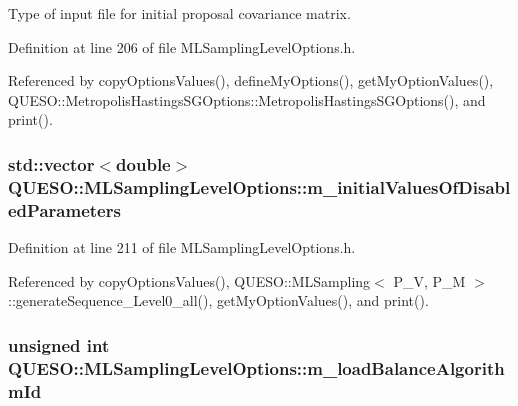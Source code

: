 Type of input file for initial proposal covariance matrix. 



Definition at line 206 of file M\-L\-Sampling\-Level\-Options.\-h.



Referenced by copy\-Options\-Values(), define\-My\-Options(), get\-My\-Option\-Values(), Q\-U\-E\-S\-O\-::\-Metropolis\-Hastings\-S\-G\-Options\-::\-Metropolis\-Hastings\-S\-G\-Options(), and print().

\hypertarget{class_q_u_e_s_o_1_1_m_l_sampling_level_options_a50cbdab5fe9fbda97aca16d206888a18}{
\subsubsection[{m\-\_\-initial\-Values\-Of\-Disabled\-Parameters}]{\setlength{\rightskip}{0pt plus 5cm}std\-::vector$<$double$>$ Q\-U\-E\-S\-O\-::\-M\-L\-Sampling\-Level\-Options\-::m\-\_\-initial\-Values\-Of\-Disabled\-Parameters}}\label{class_q_u_e_s_o_1_1_m_l_sampling_level_options_a50cbdab5fe9fbda97aca16d206888a18}


Definition at line 211 of file M\-L\-Sampling\-Level\-Options.\-h.



Referenced by copy\-Options\-Values(), Q\-U\-E\-S\-O\-::\-M\-L\-Sampling$<$ P\-\_\-\-V, P\-\_\-\-M $>$\-::generate\-Sequence\-\_\-\-Level0\-\_\-all(), get\-My\-Option\-Values(), and print().

\hypertarget{class_q_u_e_s_o_1_1_m_l_sampling_level_options_af8f5d4ef3048da3e201e43ecc0a399fb}{
\subsubsection[{m\-\_\-load\-Balance\-Algorithm\-Id}]{\setlength{\rightskip}{0pt plus 5cm}unsigned int Q\-U\-E\-S\-O\-::\-M\-L\-Sampling\-Level\-Options\-::m\-\_\-load\-Balance\-Algorithm\-Id}}\label{class_q_u_e_s_o_1_1_m_l_sampling_level_options_af8f5d4ef3048da3e201e43ecc0a399fb}


